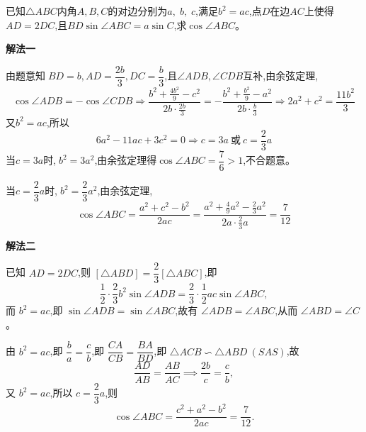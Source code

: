 \begin{questions}
    \question 已知$\triangle ABC$内角$A,B,C$的对边分别为$a,\;b,\;c$,满足$b^2=ac$,点$D$在边$AC$上使得$AD = 2DC$,且$BD \sin\angle ABC = a \sin C$,求$\cos\angle ABC$。
    \begin{solution}
        \textbf{解法一}
        
        由题意知$\;BD = b,AD = \dfrac{2b}{3},DC = \dfrac{b}{3}$,且$\angle ADB,\angle CDB$互补,由余弦定理,
        \[
        \cos\angle ADB = -\cos\angle CDB\Rightarrow \frac{b^2 + \frac{4b^2}{9} - c^2}{2b \cdot \frac{2b}{3}}=-\frac{b^2 + \frac{b^2}{9} - a^2}{2b \cdot \frac{b}{3}}\Rightarrow2a^2 + c^2 = \dfrac{11b^2}{3}
        \]
        又$b^2 = ac$,所以$$6a^2 - 11ac + 3c^2 = 0\Rightarrow c = 3a\ \text{或}\ c = \dfrac{2}{3}a$$
        当$c = 3a$时,$\;b^2 = 3a^2$,由余弦定理得$\cos\angle ABC = \dfrac{7}{6}>1$,不合题意。
        
        当$c = \dfrac{2}{3}a$时,$\;b^2 = \dfrac{2}{3}a^2$,由余弦定理,
        \[
        \cos\angle ABC = \frac{a^2 + c^2 - b^2}{2ac} = \frac{a^2 + \frac{4}{9}a^2 - \frac{2}{3}a^2}{2a \cdot \frac{2}{3}a} = \frac{7}{12}
        \]
    \end{solution}
    \begin{solution}
        \textbf{解法二}
        
        已知 $AD = 2DC$,则 $[\triangle ABD] = \dfrac{2}{3} [\triangle ABC]$,即
        \[
        \frac{1}{2} \cdot \frac{2}{3} b^2 \sin\angle ADB = \frac{2}{3} \cdot \frac{1}{2} ac \sin\angle ABC,
        \]
        而 $b^2 = ac$,即 $\sin\angle ADB = \sin\angle ABC$,故有 $\angle ADB = \angle ABC$,从而 $\angle ABD = \angle C$。
        
        由 $b^2 = ac$,即 $\dfrac{b}{a} = \dfrac{c}{b}$,即 $\dfrac{CA}{CB} = \dfrac{BA}{BD}$,即 $\triangle ACB \backsim \triangle ABD \ (SAS)$,故
        \[
        \frac{AD}{AB} = \frac{AB}{AC} \implies \frac{2b}{c} = \frac{c}{b},
        \]
        又 $b^2 = ac$,所以 $c = \dfrac{2}{3}a$,则
        \[
        \cos\angle ABC = \frac{c^2 + a^2 - b^2}{2ac} = \frac{7}{12}.
        \]
    \end{solution}


\end{questions}
